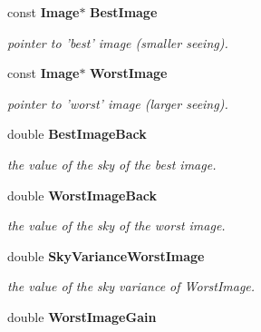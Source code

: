 \begin{CompactItemize}
\item 
{}
const {\bf Image}$\ast$ {\bf Best\-Image}\label{class_kernelfit_m0}

\begin{CompactList}\small\item\em pointer to 'best' image (smaller seeing).\item\end{CompactList}\item 
{}
const {\bf Image}$\ast$ {\bf Worst\-Image}\label{class_kernelfit_m1}

\begin{CompactList}\small\item\em pointer to 'worst' image (larger seeing).\item\end{CompactList}\item 
{}
double {\bf Best\-Image\-Back}\label{class_kernelfit_m2}

\begin{CompactList}\small\item\em the value of the sky of the best image.\item\end{CompactList}\item 
{}
double {\bf Worst\-Image\-Back}\label{class_kernelfit_m3}

\begin{CompactList}\small\item\em the value of the sky of the worst image.\item\end{CompactList}\item 
{}
double {\bf Sky\-Variance\-Worst\-Image}\label{class_kernelfit_m4}

\begin{CompactList}\small\item\em the value of the sky variance of Worst\-Image.\item\end{CompactList}\item 
{}
double {\bf Worst\-Image\-Gain}\label{class_kernelfit_m5}


\end{CompactItemize}
